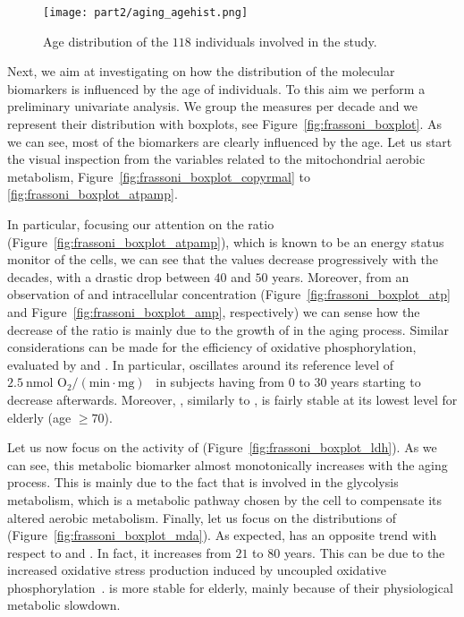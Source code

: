 \begin{figure}[]
	\centering
	\texttt{[image: part2/aging\_agehist.png]}
	\caption{Age distribution of the $118$ individuals involved in the study.} \label{fig:frassoni_agehist}
\end{figure}

Next, we aim at investigating on how the distribution of the molecular biomarkers is influenced by the age of individuals. To this aim we perform a preliminary univariate analysis. We group the measures per decade and we represent their distribution with boxplots, see Figure~\ref{fig:frassoni_boxplot}.
As we can see, most of the biomarkers are clearly influenced by the age.
Let us start the visual inspection from the variables related to the mitochondrial aerobic metabolism, \ie Figure~\ref{fig:frassoni_boxplot_copyrmal} to \ref{fig:frassoni_boxplot_atpamp}.

In particular, focusing our attention on the \atpamp ratio (Figure~\ref{fig:frassoni_boxplot_atpamp}), which is known to be an energy status monitor of the cells, we can see that the values decrease progressively with the decades, with a drastic drop between $40$ and $50$ years. Moreover, from an observation of \atp and \amp intracellular concentration (Figure~\ref{fig:frassoni_boxplot_atp} and Figure~\ref{fig:frassoni_boxplot_amp}, respectively) we can sense how the decrease of the \atpamp ratio is mainly due to the growth of \amp in the aging process.
Similar considerations can be made for the efficiency of oxidative phosphorylation, evaluated by \popyrmal and \posucc. In particular, \popyrmal oscillates around its reference level of $2.5~\text{nmol~O}_2/(\text{min}\cdot\text{mg})$~\cite{hinkle2005p} in subjects having from $0$ to $30$ years starting to decrease afterwards. Moreover, \popyrmal, similarly to \atpamp, is fairly stable at its lowest level for elderly (age $\geq 70$).

Let us now focus on the activity of \LDH (Figure~\ref{fig:frassoni_boxplot_ldh}). As we can see, this metabolic biomarker almost monotonically increases with the aging process.
This is mainly due to the fact that \LDH is involved in the glycolysis metabolism, which is a metabolic pathway chosen by the cell to compensate its altered aerobic metabolism.
Finally, let us focus on the distributions of \mda (Figure~\ref{fig:frassoni_boxplot_mda}). As expected, \mda has an opposite trend with respect to \atpamp and \popyrmal. In fact, it increases from $21$ to $80$ years. This can be due to the increased oxidative stress production induced by uncoupled oxidative phosphorylation~\cite{dai2014mitochondrial}.
\mda is more stable for elderly, mainly because of their physiological metabolic slowdown.

